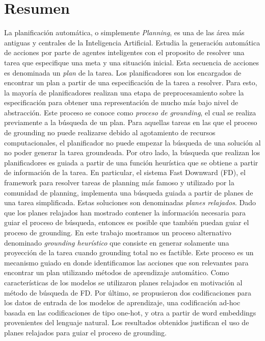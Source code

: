 \chapter*{Resumen}

La planificación automática, o simplemente \emph{Planning}, es una de las área
más antiguas y centrales de la Inteligencia Artificial. Estudia la generación
automática de acciones por parte de agentes inteligentes con el proposito de
resolver una tarea que especifique una meta y una situación inicial. Esta
secuencia de acciones es denominada un \emph{plan} de la tarea. Los
planificadores son los encargados de encontrar un plan a partir de una
especificación de la tarea a resolver. Para esto, la mayoría de planificadores
realizan una etapa de preprocesamiento sobre la especificación para obtener una
representación de mucho más bajo nivel de abstracción. Este proceso se conoce
como \emph{proceso de grounding}, el cual se realiza previamente a la búsqueda
de un plan. Para aquellas tareas en las que el proceso de grounding no puede
realizarse debido al agotamiento de recursos computacionales, el planificador no
puede empezar la búsqueda de una solución al no poder generar la tarea
groundeada. Por otro lado, la búsqueda que realizan los planificadores es guiada
a partir de una función heurística que se obtiene a partir de información de la
tarea. En particular, el sistema Fast Downward (FD), el framework para resolver
tareas de planning más famoso y utilizado por la comunidad de planning,
implementa una búsqueda guiada a partir de planes de una tarea simplificada.
Estas soluciones son denominadas \emph{planes relajados}. Dado que los planes
relajados han mostrado contener la información necesaria para guiar el proceso
de búsqueda, entonces es posible que también puedan guiar el proceso de
grounding. En este trabajo mostramos un proceso alternativo denominado
\emph{grounding heurístico} que consiste en generar solamente una proyección de
la tarea cuando grounding total no es factible. Este proceso es un mecanismo
guiado en donde identificamos las acciones que son relevantes para encontrar un
plan utilizando métodos de aprendizaje automático. Como características de los
modelos se utilizaron planes relajados en motivación al método de búsqueda de
FD. Por último, se propusieron dos codificaciones para los datos de entrada de
los modelos de aprendizaje, una codificación ad-hoc basada en las
codificaciones de tipo one-hot, y otra a partir de word embeddings provenientes
del lenguaje natural. Los resultados obtenidos justifican el uso de planes
relajados para guiar el proceso de grounding.


